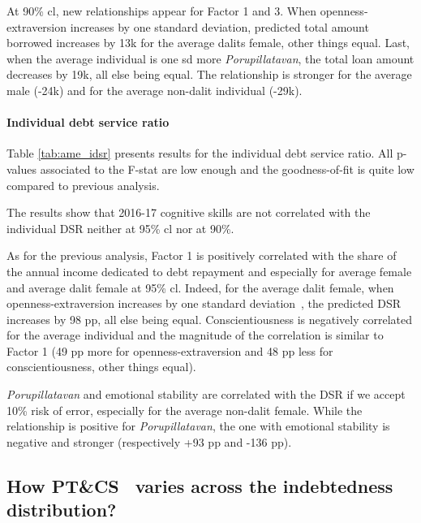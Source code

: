 \documentclass[a4paper, 12pt, onecolumn]{article}
\newcommand{\sd}{standard deviation}
\newcommand{\aebe}{all else being equal}
\newcommand{\ote}{other things equal}
\newcommand{\PTCS}{PT\&CS}
\begin{document}
At 90\% cl, new relationships appear for Factor 1 and 3.
When openness-extraversion increases by one \sd, predicted total amount borrowed increases by \rupee13k for the average dalits female, \ote.
Last, when the average individual is one sd more \textit{Porupillatavan}, the total loan amount decreases by \rupee19k, \aebe.
The relationship is stronger for the average male (-\rupee24k) and for the average non-dalit individual (-\rupee29k).
 


\paragraph{Individual debt service ratio}
Table \ref{tab:ame_idsr} presents results for the individual debt service ratio.
All p-values associated to the F-stat are low enough and the goodness-of-fit is quite low compared to previous analysis.

The results show that 2016-17 cognitive skills are not correlated with the individual DSR neither at 95\% cl nor at 90\%.

As for the previous analysis, Factor 1 is positively correlated with the share of the annual income dedicated to debt repayment and especially for average female and average dalit female at 95\% cl.
Indeed, for the average dalit female, when openness-extraversion increases by one \sd~, the predicted DSR increases by 98 pp, \aebe.
Conscientiousness is negatively correlated for the average individual and the magnitude of the correlation is similar to Factor 1 (49 pp more for openness-extraversion and 48 pp less for conscientiousness, \ote).

\textit{Porupillatavan} and emotional stability are correlated with the DSR if we accept 10\% risk of error, especially for the average non-dalit female.
While the relationship is positive for \textit{Porupillatavan}, the one with emotional stability is negative and stronger (respectively +93 pp and -136 pp).



	\subsection{How \PTCS~ varies across the indebtedness distribution?}
\end{document}
